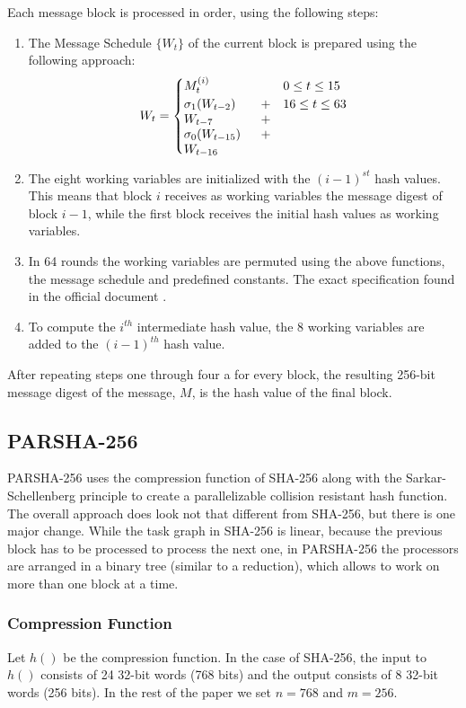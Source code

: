 \documentclass[letterpaper]{article}
\begin{document}
Each message block is processed in order, using the following steps:
\begin{enumerate}
\item The Message Schedule $\{ W_t \}$ of the current block is prepared using the following approach:\\
$$W_t = \begin{cases}
M_t^{(i)} & 0 \leq t \leq 15 \\
 \parbox[t]{.2\textwidth}{$\sigma_1(W_{t-2})+ W_{t-7} + \sigma_0(W_{t-15})+W_{t-16}$} & 16 \leq t \leq 63
\end{cases}$$

\item The eight  working variables are initialized with the  $(i-1)^{st}$ hash values. This means that block $i$ receives as working variables the message digest of block $i-1$, while the first block receives the initial hash values as working variables. 

\item In 64 rounds the working variables are permuted using the above functions, the message schedule and predefined constants. The exact specification found in the official document \cite{sha}. 

\item To compute the $i^{th}$ intermediate hash value, the 8 working variables are added to the $(i-1)^{th}$ hash value.


\end{enumerate}

After repeating steps one through four a for every block, the resulting 256-bit message digest of the message, $M$, is the hash value of the final block.

\subsection{PARSHA-256 \cite{parsha256}}
PARSHA-256 uses the compression function of SHA-256 along with the Sarkar-Schellenberg \cite{sarkar} principle to create a parallelizable collision resistant hash function. The overall approach does look not that different from SHA-256, but there is one major change. While the task graph in SHA-256 is linear, because the previous block has to be processed to process the next one, in PARSHA-256 the processors are arranged in a binary tree (similar to a reduction), which allows to work on more than one block at a time. 

\subsubsection{Compression Function}
Let $h()$ be the compression function. In the case of SHA-256, the input to $h()$ consists of 24 32-bit words (768 bits) and the output consists of 8 32-bit words (256 bits). In the rest of the paper we set $n = 768$ and $m = 256$.
\end{document}
